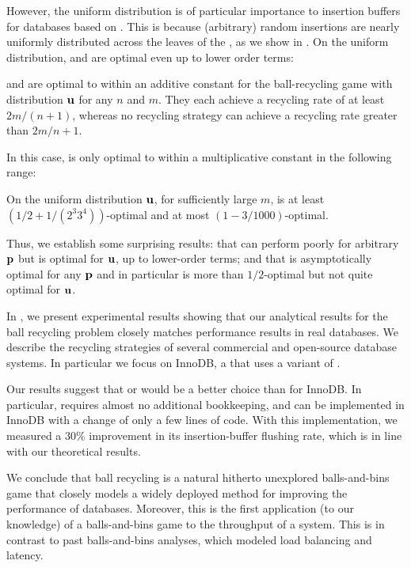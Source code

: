 However, the uniform distribution is of particular importance to insertion
buffers for databases based on \btrees{}. This is because (arbitrary) random
\btree{} insertions are nearly uniformly distributed across the leaves of the
\btree{}, as we show in . On the uniform distribution, \FB
and \GG are optimal even up to lower order terms:

\begin{theorem}\label{thm:fullestbin}
  \FB and \GG are optimal to within an additive constant for the
  ball-recycling game with distribution $\mathbf{u}$ 
  for any $n$ and $m$.  They each achieve a
  recycling rate of at least $2m/(n+1)$, whereas no recycling strategy can
  achieve a recycling rate greater than $2m/n + 1$.
\end{theorem}

In this case, \RB is only optimal to within a multiplicative constant
in the following range:

\begin{theorem}\label{thm:rbuniform}
	On the uniform distribution $\mathbf{u}$, for sufficiently large
        $m$, \RB is at least $(1/2+1/(2^3
	3^4))$-optimal and at most $(1-3/1000)$-optimal.
\end{theorem}

Thus, we establish some surprising results: that \FB can perform poorly for
arbitrary $\mathbf{p}$ but is optimal for $\mathbf{u}$, up to lower-order terms; and that \RB
is asymptotically optimal for any $\mathbf{p}$ and in particular is more than
$1/2$-optimal but not quite optimal for $\mathbf{u}$.

In , we present experimental results showing that our
analytical results for the ball recycling problem closely matches performance
results in real databases.  We describe the recycling strategies of several
commercial and open-source database systems. In particular we focus on InnoDB,
a \btree{} that uses a variant of \RB.

Our results suggest that \FB or \GG would be a better choice than \RB for
InnoDB. In particular, \GG requires almost no additional bookkeeping, and can
be implemented in InnoDB with a change of only a few lines of code.
With this implementation, we measured a 30\% improvement in its
insertion-buffer flushing rate, which is in line with our theoretical results.

We conclude that ball recycling is a natural hitherto unexplored balls-and-bins
game that closely models a widely deployed method for improving the performance
of databases. Moreover, this is the first application (to our knowledge) of a
balls-and-bins game to the throughput of a system. This is in contrast to past
balls-and-bins analyses, which modeled load balancing and latency.


